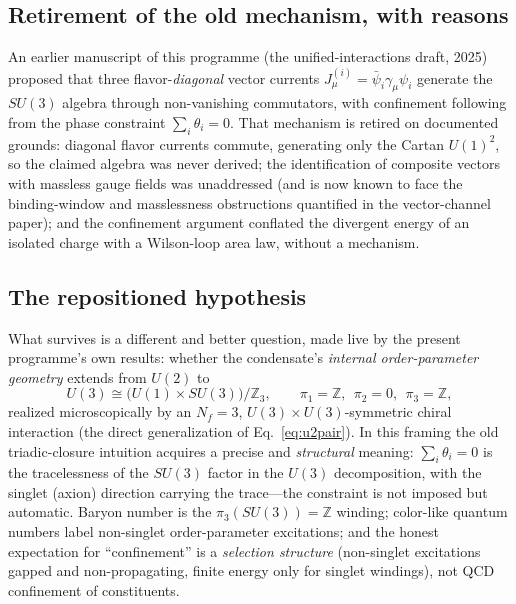 \documentclass[11pt,a4paper]{article}
\begin{document}
\subsection*{Retirement of the old mechanism, with reasons}
An earlier manuscript of this programme (the unified-interactions
draft, 2025) proposed that three flavor-\emph{diagonal} vector
currents $J^{(i)}_\mu = \bar\psi_i\gamma_\mu\psi_i$ generate the
$SU(3)$ algebra through non-vanishing commutators, with
confinement following from the phase constraint
$\sum_i\theta_i = 0$.  That mechanism is retired on documented
grounds: diagonal flavor currents commute, generating only the
Cartan $U(1)^2$, so the claimed algebra was never derived; the
identification of composite vectors with massless gauge fields
was unaddressed (and is now known to face the binding-window and
masslessness obstructions quantified in the vector-channel
paper); and the confinement argument conflated the divergent
energy of an isolated charge with a Wilson-loop area law, without
a mechanism.

\subsection*{The repositioned hypothesis}
What survives is a different and better question, made live by
the present programme's own results: whether the condensate's
\emph{internal order-parameter geometry} extends from $U(2)$ to
\begin{equation}
U(3) \cong \bigl(U(1)\times SU(3)\bigr)/\mathbb{Z}_3,
\qquad \pi_1 = \mathbb{Z},\ \ \pi_2 = 0,\ \ \pi_3 = \mathbb{Z},
\end{equation}
realized microscopically by an $N_f = 3$,
$U(3)\times U(3)$-symmetric chiral interaction (the direct
generalization of Eq.~\eqref{eq:u2pair}).  In this framing the
old triadic-closure intuition acquires a precise and
\emph{structural} meaning: $\sum_i\theta_i = 0$ is the
tracelessness of the $SU(3)$ factor in the $U(3)$ decomposition,
with the singlet (axion) direction carrying the trace---the
constraint is not imposed but automatic.  Baryon number is the
$\pi_3(SU(3)) = \mathbb{Z}$ winding; color-like quantum numbers
label non-singlet order-parameter excitations; and the honest
expectation for ``confinement'' is a \emph{selection structure}
(non-singlet excitations gapped and non-propagating, finite
energy only for singlet windings), not QCD confinement of
constituents.
\end{document}
